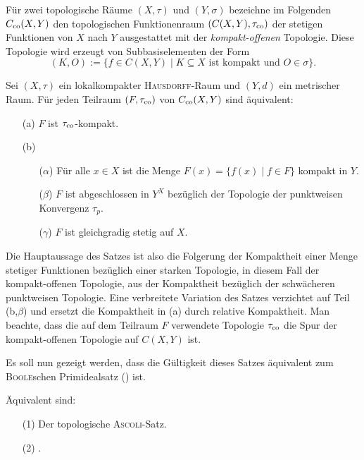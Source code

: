 Für zwei topologische Räume $(X,\tau)$ und $(Y,\sigma)$ bezeichne im Folgenden $C_{\mathrm{co}}(X,Y)$ den topologischen Funktionenraum $(C(X,Y),\tau_{\mathrm{co}})$ der stetigen Funktionen von $X$ nach $Y$ ausgestattet mit der \textit{kompakt\hyp{}offenen} Topologie.
Diese Topologie wird erzeugt von Subbasiselementen der Form
\begin{displaymath}
  (K,O) := \{f \in C(X,Y) \mid K \subseteq X \text{ ist kompakt und } O \in \sigma\}.
\end{displaymath}

\begin{defn}
  Sei $(X,\tau)$ ein lokalkompakter \textsc{Hausdorff}\hyp{}Raum und $(Y,d)$ ein metrischer Raum.
  Für jeden Teilraum $(F,\tau_{\mathrm{co}})$ von $C_{\mathrm{co}}(X,Y)$ sind äquivalent:
  \begin{enumerate}
    \item[(a)] $F$ ist $\tau_{\mathrm{co}}$\hyp{}kompakt.
    \item[(b)] \begin{enumerate}
        \item[($\alpha$)] Für alle $x \in X$ ist die Menge $F(x) = \{f(x) \mid f \in F \}$ kompakt in $Y$.
        \item[($\beta$)]  $F$ ist abgeschlossen in $Y^X$ bezüglich der Topologie der punktweisen Konvergenz $\tau_p$.
        \item[($\gamma$)] $F$ ist gleichgradig stetig auf $X$.
      \end{enumerate}
  \end{enumerate}
\end{defn}

Die Hauptaussage des Satzes ist also die Folgerung der Kompaktheit einer Menge stetiger Funktionen bezüglich einer starken Topologie, in diesem Fall der kompakt\hyp{}offenen Topologie, aus der Kompaktheit bezüglich der schwächeren punktweisen Topologie.
Eine verbreitete Variation des Satzes verzichtet auf Teil (b,$\beta$) und ersetzt die Kompaktheit in (a) durch relative Kompaktheit.
Man beachte, dass die auf dem Teilraum $F$ verwendete Topologie $\tau_{\mathrm{co}}$ die Spur der kompakt\hyp{}offenen Topologie auf $C(X,Y)$ ist.

Es soll nun gezeigt werden, dass die Gültigkeit dieses Satzes äquivalent zum \textsc{Boole}schen Primidealsatz (\PIT) ist.

\begin{thm}
  \label{thm:ascoliPIT}
  Äquivalent sind:
  \begin{enumerate}
    \item[(1)] Der topologische \textsc{Ascoli}-Satz.
    \item[(2)] \PIT.
  \end{enumerate}
\end{thm}

